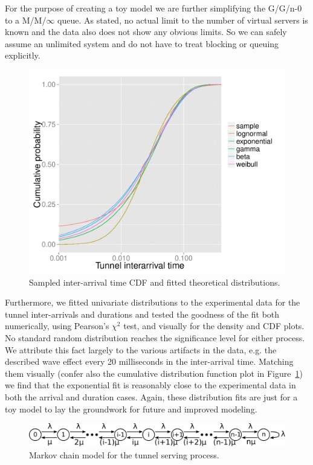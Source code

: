For the purpose of creating a toy model we are further simplifying the G/G/n-0 to a M/M/$\infty$ queue. As stated, no actual limit to the number of virtual servers is known and the data also does not show any obvious limits. So we can safely assume an unlimited system and do not have to treat blocking or queuing explicitly.

\begin{figure}[htbp]
	\centering
	\includegraphics[width=\columnwidth]{images/R-IAT-ecdfs.pdf}
	\caption{Sampled inter-arrival time CDF and fitted theoretical distributions.}
	\label{c4:fig:IAT-cdfs}
\end{figure}

Furthermore, we fitted univariate distributions to the experimental data for the tunnel inter-arrivals and durations and tested the goodness of the fit both numerically, using Pearson's $\chi^2$ test, and visually for the density and CDF plots. No standard random distribution reaches the significance level for either process. We attribute this fact largely to the various artifacts in the data, e.g. the described wave effect every 20 milliseconds in the inter-arrival time. Matching them visually (confer also the cumulative distribution function plot in Figure~\ref{c4:fig:IAT-cdfs}) we find that the exponential fit is reasonably close to the experimental data in both the arrival and duration cases. Again, these distribution fits are just for a toy model to lay the groundwork for future and improved modeling.


\begin{figure}[htbp]
	\centering
	\includegraphics[width=\columnwidth]{images/markovchain.pdf}
	\caption{Markov chain model for the tunnel serving process.}
	\label{c4:fig:markovchain}
\end{figure}

